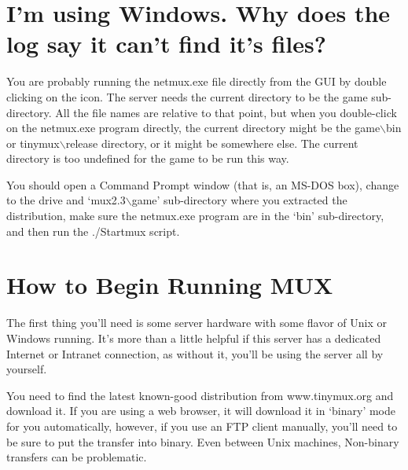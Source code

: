 \documentclass[dvips]{book}
\begin{document}
\section{I'm using Windows. Why does the log say it can't find it's files?}
You are probably running the netmux.exe file directly from the GUI by double
clicking on the icon. The server needs the current directory to be the game
sub-directory. All the file names are relative to that point, but when you
double-click on the netmux.exe program directly, the current directory might
be the game$\backslash$bin or tinymux$\backslash$release directory, or it
might be somewhere else.  The current directory is too undefined for the game
to be run this way.

You should open a Command Prompt window (that is, an MS-DOS box), change to
the drive and `mux2.3$\backslash$game' sub-directory where you extracted the
distribution, make sure the netmux.exe program are in the `bin'
sub-directory, and then run the ./Startmux script.
\section{How to Begin Running MUX}
The first thing you'll need is some server hardware with some flavor of Unix or
Windows running. It's more than a little helpful if this server has a dedicated
Internet or Intranet connection, as without it, you'll be using the
server all by yourself.

You need to find the latest known-good distribution from
www.tinymux.org and download it. If you are using a web browser, it will
download it in `binary' mode for you automatically, however, if you use an FTP
client manually, you'll need to be sure to put the transfer into binary. Even
between Unix machines, Non-binary transfers can be problematic.
\end{document}
